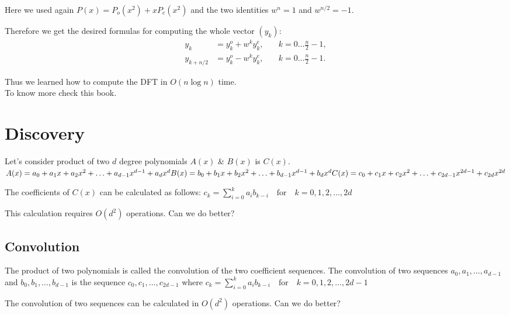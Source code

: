 \documentclass[28]{report}
\begin{document}
Here we used again $P(x) = P_o(x^2) + x P_e(x^2)$ and the two identities $w^n = 1$ and $w^{n/2} = -1$.

Therefore we get the desired formulas for computing the whole vector $(y_k)$:
\begin{align*} y_k &= y_k^o + w^k y_k^e, &\quad k = 0 \dots \frac{n}{2} - 1, \\ y_{k+n/2} &= y_k^o - w^k y_k^e, &\quad k = 0 \dots \frac{n}{2} - 1. \end{align*}

Thus we learned how to compute the DFT in $O(n \log n)$ time.\\
To know more check this\cite{fftbook1} book.

\chapter{Discovery}
Let's consider product of two \(d\) degree polynomials \(A(x)\) \& \(B(x)\) is \(C(x)\).
\begin{math}
	A(x) = a_0 + a_1x + a_2x^2 + \ldots + a_{d-1}x^{d-1} + a_dx^d \\
	B(x) = b_0 + b_1x + b_2x^2 + \ldots + b_{d-1}x^{d-1} + b_dx^d \\
	C(x) = c_0 + c_1x + c_2x^2 + \ldots + c_{2d-1}x^{2d-1} + c_{2d}x^{2d}
\end{math}

The coefficients of \(C(x)\) can be calculated as follows:
\begin{math}
	c_k = \sum_{i=0}^{k} a_ib_{k-i} \quad \text{for} \quad k = 0, 1, 2, \ldots, 2d
\end{math}

This calculation requires \(O(d^2)\) operations. Can we do better?

\section{Convolution}
The product of two polynomials is called the convolution of the two coefficient sequences. The convolution of two sequences \(a_0, a_1, \ldots, a_{d-1}\) and \(b_0, b_1, \ldots, b_{d-1}\) is the sequence \(c_0, c_1, \ldots, c_{2d-1}\) where
\begin{math}
	c_k = \sum_{i=0}^{k} a_ib_{k-i} \quad \text{for} \quad k = 0, 1, 2, \ldots, 2d-1
\end{math}

The convolution of two sequences can be calculated in \(O(d^2)\) operations. Can we do better?
\end{document}
